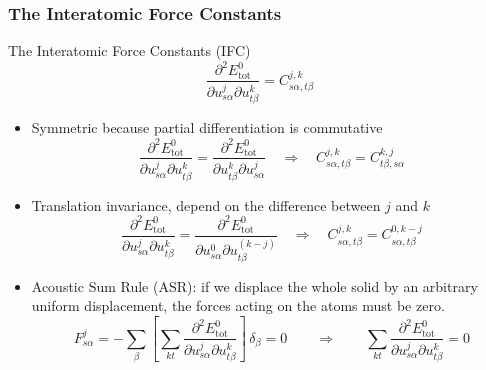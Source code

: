 \begin{frame}
  \frametitle{The Interatomic Force Constants}
  The Interatomic Force Constants (IFC)
  \begin{equation*}
    \frac{
      \partial^2 E^0_{\text{tot}}
    }{
      \partial {u}_{s\alpha}^j
      \partial {u}_{t\beta}^k
    }
    =
    C_{s\alpha, t\beta}^{j, k}
  \end{equation*}

  \begin{itemize}
  \item Symmetric because partial differentiation is commutative
    \begin{equation}
      \label{eq:ifc_sym_prop}
        \frac{
        \partial^2 E^0_{\text{tot}}
        }{
        \partial {u}_{s\alpha}^j
        \partial {u}_{t\beta}^k
        }
        =
        \frac{
        \partial^2 E^0_{\text{tot}}
        }{
        \partial {u}_{t\beta}^k
        \partial {u}_{s\alpha}^j
        }
        \quad \Rightarrow \quad
        C_{s\alpha, t\beta}^{j, k}
        =
        C_{t\beta, s\alpha}^{k, j}
    \end{equation}
  \item Translation invariance, depend on the difference between $j$ and $k$
    \begin{equation}
      \label{eq:ifc_ti_prop}
        \frac{
        \partial^2 E^0_{\text{tot}}
        }{
        \partial {u}_{s\alpha}^j
        \partial {u}_{t\beta}^k
        }
        =
        \frac{
        \partial^2 E^0_{\text{tot}}
        }{
        \partial {u}_{s\alpha}^0
        \partial {u}_{t\beta}^{(k-j)}
        }
        \quad \Rightarrow \quad
        C_{s\alpha, t\beta}^{j, k}
        =
        C_{s\alpha, t\beta}^{0, k-j}
    \end{equation}
  \item Acoustic Sum Rule (ASR): if we displace the whole solid by an arbitrary uniform
    displacement, the forces acting on the atoms must be zero.
    \begin{equation}
      \label{eq:ifc_asr_prop}
      F_{s\alpha}^j =
      - \sum_{\beta}
      \left[
        \sum_{kt}
        \frac{
        \partial^2 E^0_{\text{tot}}
        }{
        \partial {u}_{s\alpha}^j
        \partial {u}_{t\beta}^k
        }
      \right]
      \,
      \delta_\beta
      = 0
      \qquad\Rightarrow\qquad
      \sum_{kt}
        \frac{
        \partial^2 E^0_{\text{tot}}
        }{
        \partial {u}_{s\alpha}^j
        \partial {u}_{t\beta}^k
        } = 0
      \end{equation}
  \end{itemize}
\end{frame}
